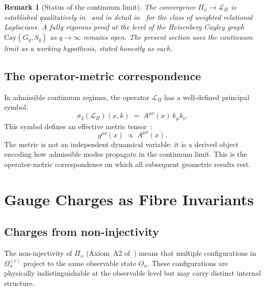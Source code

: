 \documentclass[11pt,a4paper]{article}
\newtheorem{remark}[theorem]{Remark}
\begin{document}
      \begin{remark}[Status of the continuum limit]
        The convergence $\Pi_n \to \mathcal{L}_\Pi$ is established qualitatively
        in~\cite{FoundationM} and in detail in~\cite{BornInfeld} for the class of
        weighted relational Laplacians.
        A fully rigorous proof at the level of the Heisenberg Cayley graph
        $\mathrm{Cay}(G_q, S_q)$ as $q \to \infty$ remains open.
        The present section uses the continuum limit as a working hypothesis,
        stated honestly as such.
      \end{remark}

    \subsection{The operator-metric correspondence}

      In admissible continuum regimes, the operator $\mathcal{L}_\Pi$ has a
      well-defined principal symbol:
      \begin{equation}
        \label{eq:principal-symbol}
        \sigma_2(\mathcal{L}_\Pi)(x, k)
        \;=\; A^{\mu\nu}(x)\,k_\mu k_\nu.
      \end{equation}
      This symbol defines an effective metric tensor~\cite{BornInfeld}:
      \begin{equation}
        \label{eq:metric-from-symbol}
        g^{\mu\nu}(x) \;\propto\; A^{\mu\nu}(x).
      \end{equation}
      The metric is not an independent dynamical variable: it is a derived object
      encoding how admissible modes propagate in the continuum limit.
      This is the operator-metric correspondence on which all subsequent geometric
      results rest.

  \section{Gauge Charges as Fibre Invariants}
    \label{sec:charges}

    \subsection{Charges from non-injectivity}

      The non-injectivity of $\Pi_n$ (Axiom~A2 of~\cite{FoundationM}) means that
      multiple configurations in $\Omega_n^{(c)}$ project to the same observable
      state $O_n$.
      These configurations are physically indistinguishable at the observable level
      but may carry distinct internal structure.
\end{document}
